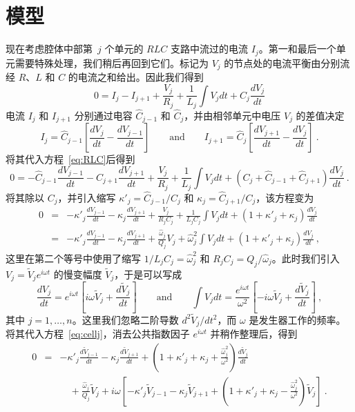 \documentclass[12pt]{article}
\newcommand\tV{\tilde V}
\newcommand\ho{\hat\omega}
\newcommand\hC{\hat C}
\begin{document}
\section{模型}
\label{sec:mod}
%
现在考虑腔体中部第~$j$ 个单元的 $RLC$ 支路中流过的电流 $I_j$。第一和最后一个单元需要特殊处理，我们稍后再回到它们。标记为 $V_j$ 的节点处的电流平衡由分别流经 $R$、$L$ 和 $C$ 的电流之和给出。因此我们得到~\cite{VZAP}
\begin{equation}\label{eq:RLC}
  0=I_j-I_{j+1}+\frac{V_j}{R_j}+\frac{1}{L_j}\int V_j dt+ C_j\frac{dV_j}{dt}
\end{equation}
电流 $I_j$ 和 $I_{j+1}$ 分别通过电容 $\hat C_{j-1}$ 和 $\hat C_j$，并由相邻单元中电压 $V_j$ 的差值决定
\begin{equation}
  I_j=\hC_{j-1}\left[\frac{dV_j}{dt}-\frac{dV_{j-1}}{dt}\right]
  \qquad\mathrm{and}\qquad
  I_{j+1}=\hC_{j}\left[\frac{dV_{j+1}}{dt}-\frac{dV_{j}}{dt}\right] \ . 
\end{equation}
将其代入方程~\ref{eq:RLC}后得到
\begin{equation}
  0=-\hC_{j-1}\frac{dV_{j-1}}{dt} -\hC_{j+1}\frac{dV_{j+1}}{dt} + \frac{V_j}{R_j}
  +\frac{1}{L_j}\int V_j dt+ \left(C_j+\hC_{j-1}+\hC_{j+1}\right)\frac{dV_j}{dt}\ .
\end{equation}
将其除以 $C_j$，并引入缩写 $\kappa'_j=\hC_{j-1}/C_j$ 和 $\kappa_j=\hC_{j+1}/C_j$，该方程变为
\begin{eqnarray}\label{eq:cellj}
  0&=&-\kappa'_j\frac{dV_{j-1}}{dt}-\kappa_j\frac{dV_{j+1}}{dt}+ \frac{V_j}{R_jC_j}
       +\frac{1}{L_jC_j}\int V_j dt+ \left(1+\kappa'_j+\kappa_j\right)\frac{dV_j}{dt}
  \nonumber\\
   &=&-\kappa'_j\frac{dV_{j-1}}{dt}-\kappa_j\frac{dV_{j+1}}{dt}+ \frac{\ho_j}{Q_j}V_j
       +\ho_j^2\int V_j dt+ \left(1+\kappa'_j+\kappa_j\right)\frac{dV_j}{dt}\ ,
\end{eqnarray}
这里在第二个等号中使用了缩写 $1/L_jC_j=\ho_j^2$ 和 $R_jC_j=Q_j/\ho_j$。此时我们引入 $V_j=\tV_je^{i\omega t}$ 的慢变幅度 $\tV_j$，于是可以写成~\cite{VZAP}
\begin{equation}\label{eq:harm}
  \frac{dV_j}{dt}=e^{i\omega t}\left[i\omega\tV_j + \frac{d\tV_j}{dt}\right]
  \qquad\mathrm{and}\qquad
  \int V_j dt = \frac{e^{i\omega t}}{\omega^2}\left[-i\omega\tV_j + \frac{d\tV_j}{dt}\right]\ ,
\end{equation}
其中 $j=1,\dots,n$。这里我们忽略二阶导数 $d^2\tV_j/dt^2$，而 $\omega$ 是发生器工作的频率。将其代入方程~\ref{eq:cellj}，消去公共指数因子 $e^{i\omega t}$ 并稍作整理后，得到
\begin{eqnarray}\label{eq:tmp1}
  0&=&-\kappa'_j \frac{d\tV_{j-1}}{dt}-\kappa_j \frac{d\tV_{j+1}}{dt}
  +\left(1+\kappa'_j+\kappa_j+\frac{\ho_j^2}{\omega^2}\right)\frac{d\tV_j}{dt} \\
   &&\quad + \frac{\ho_j}{Q_j}\tV_j+i\omega\left[-\kappa'_j\tV_{j-1}-\kappa_j\tV_{j+1} 
      +\left(1+\kappa'_j+\kappa_j-\frac{\ho_j^2}{\omega^2}\right)\tV_j\right]\ .\nonumber
\end{eqnarray}
\end{document}
